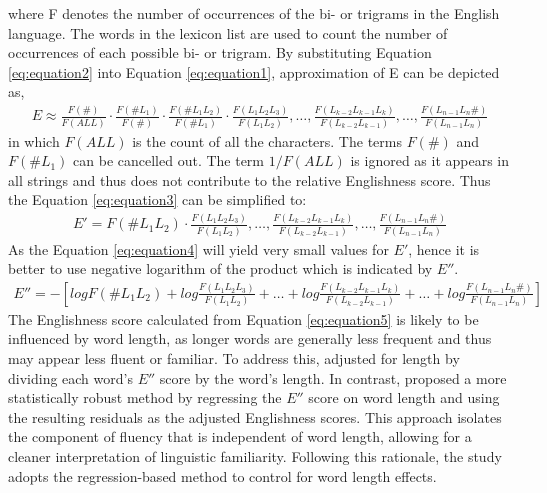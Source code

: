 \documentclass[a4paper,11pt]{report}
\begin{document}
\noindent where F denotes the number of occurrences of the bi- or trigrams in the English language. The words in the lexicon list are used to count the number of occurrences of each possible bi- or trigram. By substituting Equation \ref{eq:equation2} into Equation \ref{eq:equation1}, approximation of E can be depicted as, 
\begin{align}
    E \approx \frac{F(\#)}{F(ALL)} \cdot \frac{F(\#L_1)}{F(\#)} \cdot \frac{F(\#L_1L_2)}{F(\# L_1)} \cdot \frac{F(L_1 L_2 L_3)}{F(L_1 L_2)} , \ldots, \frac{F(L_{k-2}L_{k-1}L_{k})}{F(L_{k-2}L_{k-1})} , \ldots, \frac{F(L_{n-1}L_n\#)}{F(L_{n-1}L_n)}
\label{eq:equation3}
\end{align}
in which $F(ALL)$ is the count of all the characters. The terms $F(\#)$ and $F(\#L_1)$ can be cancelled out. The term $1/F(ALL)$ is ignored as it appears in all strings and thus does not contribute to the relative Englishness score. Thus the Equation \ref{eq:equation3} can be simplified to:
\begin{align}
    E' = {F(\#L_1L_2)}\cdot \frac{F(L_1 L_2 L_3)}{F(L_1 L_2)} , \ldots, \frac{F(L_{k-2}L_{k-1}L_{k})}{F(L_{k-2}L_{k-1})} , \ldots, \frac{F(L_{n-1}L_n\#)}{F(L_{n-1}L_n)}
\label{eq:equation4}
\end{align}
As the Equation \ref{eq:equation4} will yield very small values for $E'$, hence it is better to use negative logarithm of the product which is indicated by $E''$.
\begin{align}
    E'' = -\left[logF(\#L_1L_2) + log\frac{F(L_1 L_2 L_3)}{F(L_1 L_2)} + \ldots + log \frac{F(L_{k-2}L_{k-1}L_{k})}{F(L_{k-2}L_{k-1})} + \ldots + log \frac{F(L_{n-1}L_n\#)}{F(L_{n-1}L_n)}\right]
\label{eq:equation5}
\end{align}
The Englishness score calculated from Equation \ref{eq:equation5} is likely to be influenced by word length, as longer words are generally less frequent and thus may appear less fluent or familiar. To address this,  adjusted for length by dividing each word’s $E''$ score by the word's length. In contrast,  proposed a more statistically robust method by regressing the $E''$ score on word length and using the resulting residuals as the adjusted Englishness scores. This approach isolates the component of fluency that is independent of word length, allowing for a cleaner interpretation of linguistic familiarity. Following this rationale, the study adopts the regression-based method to control for word length effects.
\end{document}
